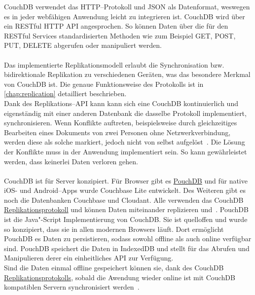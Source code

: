 CouchDB verwendet das \gls{HTTP}--Protokoll und \gls{JSON} als Datenformat, weswegen es in jeder webfähigen Anwendung leicht zu integrieren ist. CouchDB wird über ein \gls{REST}ful \gls{HTTP} \gls{API} angesprochen. So können Daten über die für den \gls{REST}ful Services standardisierten Methoden wie zum Beispiel GET, POST, PUT, DELETE abgerufen oder manipuliert werden.\\\\
%
%
Das implementierte Replikationsmodell erlaubt die Synchronisation bzw. bidirektionale Replikation zu verschiedenen Geräten, was das besondere Merkmal von CouchDB ist.
Die genaue Funktionsweise des Protokolls ist in \autoref{chap:replication} detailliert beschrieben.\\
% 
Dank des Replikations--\gls{API} kann kann sich eine CouchDB kontinuierlich und eigenständig mit einer anderen Datenbank die dasselbe Protokoll implementiert, synchronisieren.
Wenn Konflikte auftreten, beispielsweise durch gleichzeitiges Bearbeiten eines Dokuments von zwei Personen ohne Netzwerkverbindung, werden diese als solche markiert, jedoch nicht von selbst aufgelöst~\cite{couch}. Die Lösung der Konflikte muss in der Anwendung implementiert sein.
So kann gewährleistet werden, dass keinerlei Daten verloren gehen.\\\\
%
%
CouchDB ist für Server konzipiert. Für Browser gibt es \hyperref[chap:pouch]{PouchDB} und für native iOS- und Android--\glspl{App} wurde Couchbase Lite entwickelt.
Des Weiteren gibt es noch die Datenbanken Couchbase und Cloudant.
Alle verwenden das CouchDB \hyperref[chap:replication]{Replikationsprotokoll} und können Daten miteinander replizieren und~\cite{couch}.
%
%
PouchDB ist die Java"-Script Implementierung von CouchDB.
Sie ist quelloffen und wurde so konzipiert, dass sie in allen modernen Browsers läuft. Dort ermöglicht PouchDB es Daten zu persistieren, sodass sowohl offline als auch online verfügbar sind.
PouchDB speichert die Daten in IndexedDB und stellt für das Abrufen und Manipulieren derer ein einheitliches \gls{API} zur Verfügung.\\
Sind die Daten einmal offline gespeichert können sie, dank des CouchDB \hyperref[chap:replication]{Replikationsprotokolls}, sobald die Awendung wieder online ist mit CouchDB kompatiblen Servern synchronisiert werden~\cite{pouch}.